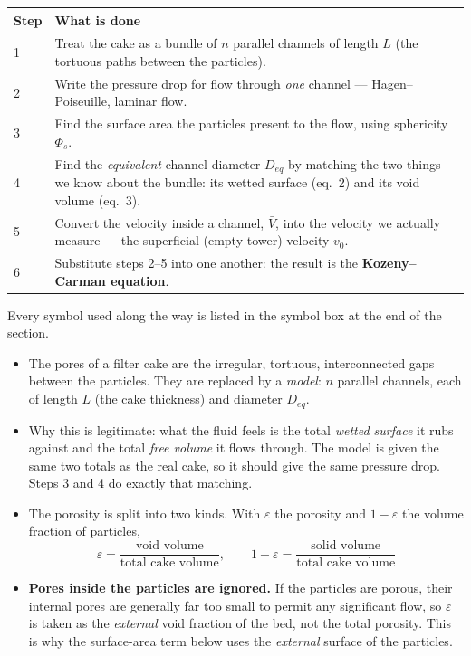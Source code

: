 \documentclass[10pt,a4paper]{article}
\newcommand{\spsub}[1]{\par\addvspace{7pt}\noindent{\color{accent}\bfseries #1}\par\addvspace{3pt}\nopagebreak}
\begin{document}
\begin{formulabox}
{\small
\begin{tabularx}{\linewidth}{@{}lX@{}}
\toprule
\textbf{Step} & \textbf{What is done}\\
\midrule
1 & Treat the cake as a bundle of $n$ parallel channels of length $L$ (the tortuous paths between the particles).\\
2 & Write the pressure drop for flow through \emph{one} channel --- Hagen--Poiseuille, laminar flow.\\
3 & Find the surface area the particles present to the flow, using sphericity $\Phi_s$.\\
4 & Find the \emph{equivalent} channel diameter $D_{eq}$ by matching the two things we know about the bundle: its wetted surface (eq.~2) and its void volume (eq.~3).\\
5 & Convert the velocity inside a channel, $\bar V$, into the velocity we actually measure --- the superficial (empty-tower) velocity $v_0$.\\
6 & Substitute steps 2--5 into one another: the result is the \textbf{Kozeny--Carman equation}.\\
\bottomrule
\end{tabularx}}
\vspace{2pt}
{\small Every symbol used along the way is listed in the symbol box at the end of the section.}
\end{formulabox}

\spsub{Step 1 --- the picture of the cake}
\begin{itemize}
  \item The pores of a filter cake are the irregular, tortuous, interconnected gaps between the particles. They are replaced by a \emph{model}: $n$ parallel channels, each of length $L$ (the cake thickness) and diameter $D_{eq}$.
  \item Why this is legitimate: what the fluid feels is the total \emph{wetted surface} it rubs against and the total \emph{free volume} it flows through. The model is given the same two totals as the real cake, so it should give the same pressure drop. Steps 3 and 4 do exactly that matching.
  \item The porosity is split into two kinds. With $\varepsilon$ the porosity and $1-\varepsilon$ the volume fraction of particles,
  \[
  \varepsilon=\frac{\text{void volume}}{\text{total cake volume}},\qquad 1-\varepsilon=\frac{\text{solid volume}}{\text{total cake volume}}
  \]
  \item \textbf{Pores inside the particles are ignored.} If the particles are porous, their internal pores are generally far too small to permit any significant flow, so $\varepsilon$ is taken as the \emph{external} void fraction of the bed, not the total porosity. This is why the surface-area term below uses the \emph{external} surface of the particles.
\end{itemize}
\end{document}
